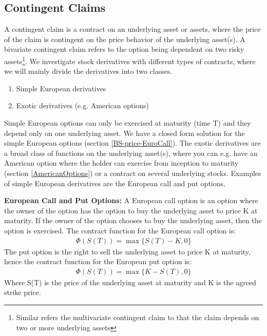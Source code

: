 
\subsection{Contingent Claims}
A contingent claim is a contract on an underlying asset or assets, where the price of the claim is contingent on the price behavior of the underlying asset(s). A bivariate contingent claim refers to the option being dependent on two risky assets\footnote{Similar refers the multivariate contingent claim to that the claim depends on two or more underlying assets}. We investigate stock derivatives with different types of contracts, where we will mainly divide the derivatives into two classes. 
\begin{enumerate}
\item Simple European derivatives
\item Exotic derivatives (e.g. American options)
\end{enumerate}
Simple European options can only be exercised at maturity (time T) and they depend only on one underlying asset. We have a closed form solution for the simple European options (section \ref{BS-price-EuroCall}). The exotic derivatives are a broad class of functions on the underlying asset(s), where you can e.g. have an American option where the holder can exercise from inception to maturity (section \ref{AmericanOptions}) or a contract on several underlying stocks. Examples of simple European derivatives are the European call and put options.

\theoremstyle{definition}
\begin{definition}{\textbf{European Call and Put Options:}}\label{def:CallOptions}
A European call option is an option where the owner of the option has the option to buy the underlying asset to price K at maturity. If the owner of the option chooses to buy the underlying asset, then the option is exercised. The contract function for the European call option is:
\begin{equation*}
\begin{split}
\Phi(S(T))=\max\{S(T)-K, 0\}
\end{split}
\end{equation*}
The put option is the right to sell the underlying asset to price K at maturity, hence the contract function for the European put option is:
\begin{equation*}
\begin{split}
\Phi(S(T))=\max\{K-S(T), 0\}
\end{split}
\end{equation*}
Where S(T) is the price of the underlying asset at maturity and K is the agreed strike price.
\end{definition}

